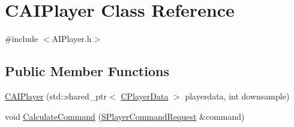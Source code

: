 \hypertarget{classCAIPlayer}{}\section{C\+A\+I\+Player Class Reference}
\label{classCAIPlayer}


{\ttfamily \#include $<$A\+I\+Player.\+h$>$}

\subsection*{Public Member Functions}
\begin{DoxyCompactItemize}
\item 
\hyperlink{classCAIPlayer_ab8b156d5fdce4d5ecf24624523fe5337}{C\+A\+I\+Player} (std\+::shared\+\_\+ptr$<$ \hyperlink{classCPlayerData}{C\+Player\+Data} $>$ playerdata, int downsample)
\item 
void \hyperlink{classCAIPlayer_ae2742efd250c7d6c00b659ccc29c4be3}{Calculate\+Command} (\hyperlink{structSPlayerCommandRequest}{S\+Player\+Command\+Request} \&command)
\end{DoxyCompactItemize}
